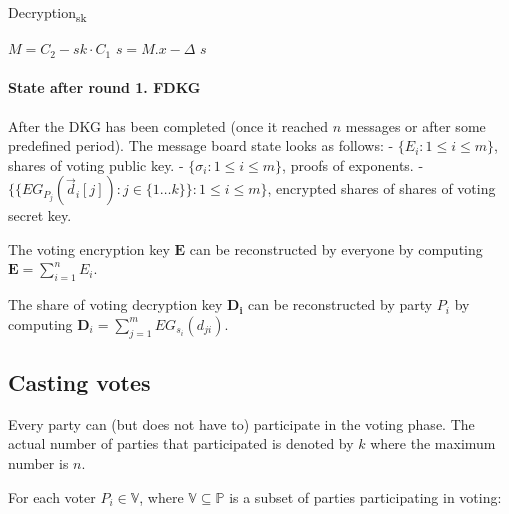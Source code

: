 \documentclass{article}
\begin{document}
\begin{algorithm}
    \caption{Decryption\textsubscript{sk}}
    
    
    $M = C_2 - sk \cdot C_1$\;
    $s = M.x - \Delta$\;
    \Return $s$\;
\end{algorithm}

\paragraph*{State after round 1. FDKG}

After the DKG has been completed (once it reached $n$ messages or after some predefined period). The message board state looks as follows:
- $\{E_{i} : 1 \leq i \leq m\}$, shares of voting public key.
- $\{\sigma_{i} : 1 \leq i \leq m\}$, proofs of exponents.
- $\{\{EG_{P_{j}}(\vec{d}_{i}[j]) : j \in \{1\dots k\}\} : 1 \leq i \leq m \}$, encrypted shares of shares of voting secret key.

The voting encryption key $\textbf{E}$ can be reconstructed by everyone by computing $\mathbf{E}=\sum_{i=1}^{n} E_{i}$.

The share of voting decryption key $\mathbf{D_i}$ can be reconstructed by party $P_i$ by computing $\mathbf{D}_{i}=\sum_{j=1}^{m} EG_{s_{i}}(d_{ji})$.


\subsection{Casting votes}

Every party can (but does not have to) participate in the voting phase. The actual number of parties that participated is denoted by $k$ where the maximum number is $n$.

For each voter $P_i \in \mathbb{V}$, where $\mathbb{V} \subseteq  \mathbb{P}$ is a subset of parties participating in voting:
\end{document}
